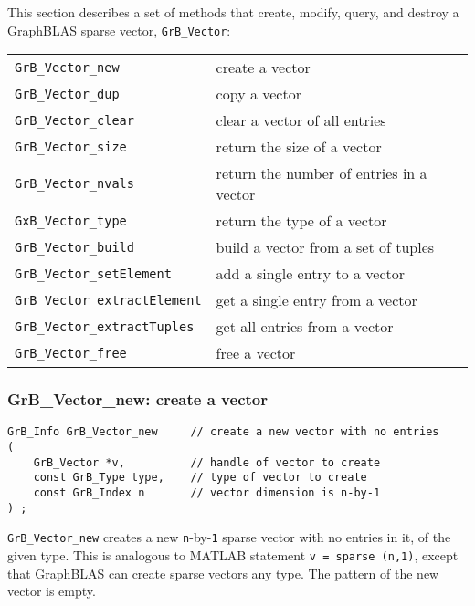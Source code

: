 \documentclass[12pt]{article}
\begin{document}
This section describes a set of methods that create, modify, query,
and destroy a GraphBLAS sparse vector, \verb'GrB_Vector':

\vspace{0.2in}
{\footnotesize
\begin{tabular}{ll}
\hline
\verb'GrB_Vector_new'            & create a vector \\
\verb'GrB_Vector_dup'            & copy a vector \\
\verb'GrB_Vector_clear'          & clear a vector of all entries \\
\verb'GrB_Vector_size'           & return the size of a vector \\
\verb'GrB_Vector_nvals'          & return the number of entries in a vector \\
\verb'GxB_Vector_type'           & return the type of a vector \\
\verb'GrB_Vector_build'          & build a vector from a set of tuples \\
\verb'GrB_Vector_setElement'     & add a single entry to a vector \\
\verb'GrB_Vector_extractElement' & get a single entry from a vector \\
\verb'GrB_Vector_extractTuples'  & get all entries from a vector \\
\verb'GrB_Vector_free'           & free a vector \\
\hline
\end{tabular}
}

\subsubsection{{\sf GrB\_Vector\_new:}           create a vector}
\label{vector_new}

\begin{mdframed}[userdefinedwidth=6in]
{\footnotesize
\begin{verbatim}
GrB_Info GrB_Vector_new     // create a new vector with no entries
(
    GrB_Vector *v,          // handle of vector to create
    const GrB_Type type,    // type of vector to create
    const GrB_Index n       // vector dimension is n-by-1
) ;
\end{verbatim}
} \end{mdframed}

\verb'GrB_Vector_new' creates a new \verb'n'-by-\verb'1' sparse vector with no
entries in it, of the given type.  This is analogous to MATLAB statement
\verb'v = sparse (n,1)', except that GraphBLAS can create sparse vectors any
type.  The pattern of the new vector is empty.
\end{document}

